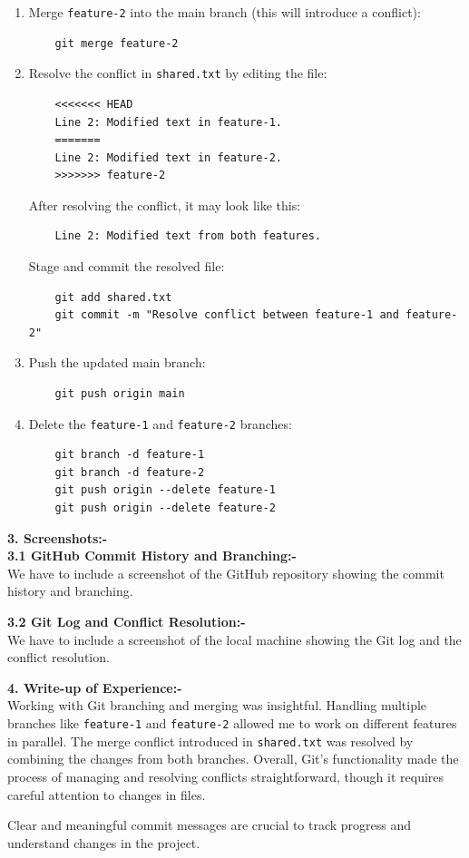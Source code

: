 \documentclass[a4paper,12pt]{article}
\begin{document}
\begin{enumerate}
    \item Merge \texttt{feature-2} into the main branch (this will introduce a conflict):
    \begin{verbatim}
    git merge feature-2
    \end{verbatim}
    
    \item Resolve the conflict in \texttt{shared.txt} by editing the file:
    \begin{verbatim}
    <<<<<<< HEAD
    Line 2: Modified text in feature-1.
    =======
    Line 2: Modified text in feature-2.
    >>>>>>> feature-2
    \end{verbatim}
    After resolving the conflict, it may look like this:
    \begin{verbatim}
    Line 2: Modified text from both features.
    \end{verbatim}
    
    Stage and commit the resolved file:
    \begin{verbatim}
    git add shared.txt
    git commit -m "Resolve conflict between feature-1 and feature-2"
    \end{verbatim}
    
    \item Push the updated main branch:
    \begin{verbatim}
    git push origin main
    \end{verbatim}
    
    \item Delete the \texttt{feature-1} and \texttt{feature-2} branches:
    \begin{verbatim}
    git branch -d feature-1
    git branch -d feature-2
    git push origin --delete feature-1
    git push origin --delete feature-2
    \end{verbatim}
\end{enumerate}

\textbf{3. Screenshots:-}\\

\textbf{3.1 GitHub Commit History and Branching:-}\\
We have to include a screenshot of the GitHub repository showing the commit history and branching.

\textbf{3.2 Git Log and Conflict Resolution:-}\\
We have to include a screenshot of the local machine showing the Git log and the conflict resolution.


\textbf{4. Write-up of Experience:-}\\
Working with Git branching and merging was insightful. Handling multiple branches like \texttt{feature-1} and \texttt{feature-2} allowed me to work on different features in parallel. The merge conflict introduced in \texttt{shared.txt} was resolved by combining the changes from both branches. Overall, Git's functionality made the process of managing and resolving conflicts straightforward, though it requires careful attention to changes in files.

Clear and meaningful commit messages are crucial to track progress and understand changes in the project.
\end{document}
